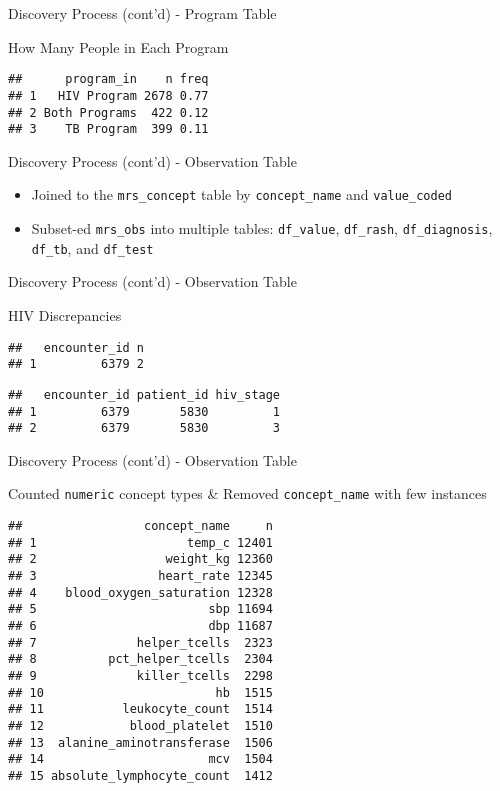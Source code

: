 \documentclass[ignorenonframetext,]{beamer}
\providecommand{\tightlist}{%
\setlength{\itemsep}{0pt}\setlength{\parskip}{0pt}}
\begin{document}
\begin{frame}[fragile]{Discovery Process (cont'd) - Program Table}

How Many People in Each Program

\begin{verbatim}
##      program_in    n freq
## 1   HIV Program 2678 0.77
## 2 Both Programs  422 0.12
## 3    TB Program  399 0.11
\end{verbatim}

\end{frame}

\begin{frame}[fragile]{Discovery Process (cont'd) - Observation Table}

\begin{itemize}
\tightlist
\item
  Joined to the \texttt{mrs\_concept} table by \texttt{concept\_name}
  and \texttt{value\_coded}
\item
  Subset-ed \texttt{mrs\_obs} into multiple tables: \texttt{df\_value},
  \texttt{df\_rash}, \texttt{df\_diagnosis}, \texttt{df\_tb}, and
  \texttt{df\_test}
\end{itemize}

\end{frame}

\begin{frame}[fragile]{Discovery Process (cont'd) - Observation Table}

HIV Discrepancies

\begin{verbatim}
##   encounter_id n
## 1         6379 2
\end{verbatim}

\begin{verbatim}
##   encounter_id patient_id hiv_stage
## 1         6379       5830         1
## 2         6379       5830         3
\end{verbatim}

\end{frame}

\begin{frame}[fragile]{Discovery Process (cont'd) - Observation Table}

Counted \texttt{numeric} concept types \& Removed \texttt{concept\_name}
with few instances

\begin{verbatim}
##                 concept_name     n
## 1                     temp_c 12401
## 2                  weight_kg 12360
## 3                 heart_rate 12345
## 4    blood_oxygen_saturation 12328
## 5                        sbp 11694
## 6                        dbp 11687
## 7              helper_tcells  2323
## 8          pct_helper_tcells  2304
## 9              killer_tcells  2298
## 10                        hb  1515
## 11           leukocyte_count  1514
## 12            blood_platelet  1510
## 13  alanine_aminotransferase  1506
## 14                       mcv  1504
## 15 absolute_lymphocyte_count  1412
\end{verbatim}

\end{frame}
\end{document}
